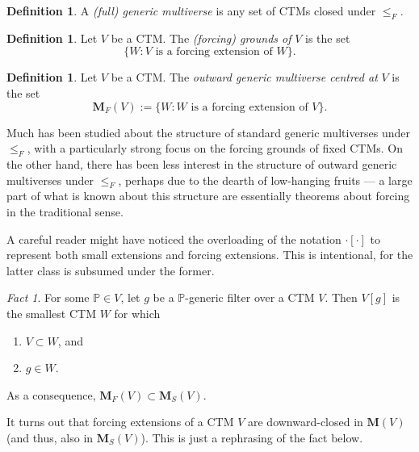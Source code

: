 \documentclass[12pt, twoside]{memoir}
\numberwithin{equation}{section}
\theoremstyle{definition}
\newtheorem{defi}[thm]{Definition}
\theoremstyle{remark}
\newtheorem{fact}[thm]{Fact}
\theoremstyle{definition}
\theoremstyle{definition}
\theoremstyle{definition}
\theoremstyle{remark}
\begin{document}
\begin{defi}
A \emph{(full) generic multiverse} is any set of CTMs closed under $\leq_F$.
\end{defi}

\begin{defi}
Let $V$ be a CTM. The \emph{(forcing) grounds of} $V$ is the set
\begin{equation*}
    \{W : V \text{ is a forcing extension of } W\} \text{.}
\end{equation*}
\end{defi}

\begin{defi}\label{def9116}
Let $V$ be a CTM. The \emph{outward generic multiverse centred at} $V$ is the set
\begin{equation*}
    \mathbf{M}_F(V) := \{W : W \text{ is a forcing extension of } V\} \text{.}
\end{equation*}
\end{defi} 

Much has been studied about the structure of standard generic multiverses under $\leq_F$, with a particularly strong focus on the forcing grounds of fixed CTMs. On the other hand, there has been less interest in the structure of outward generic multiverses under $\leq_F$, perhaps due to the dearth of low-hanging fruits --- a large part of what is known about this structure are essentially theorems about forcing in the traditional sense.

A careful reader might have noticed the overloading of the notation $\cdot [\cdot]$ to represent both small extensions and forcing extensions. This is intentional, for the latter class is subsumed under the former.

\begin{fact}
For some $\mathbb{P} \in V$, let $g$ be a $\mathbb{P}$-generic filter over a CTM $V$. Then $V[g]$ is the smallest CTM $W$ for which
\begin{enumerate}[label=(\alph*)]
    \item $V \subset W$, and
    \item $g \in W$.
\end{enumerate}
As a consequence, $\mathbf{M}_F(V) \subset \mathbf{M}_S(V)$.
\end{fact}

It turns out that forcing extensions of a CTM $V$ are downward-closed in $\mathbf{M}(V)$ (and thus, also in $\mathbf{M}_S(V)$). This is just a rephrasing of the fact below.
\end{document}
